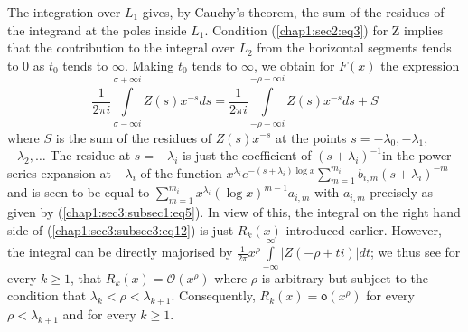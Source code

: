 The integration over $L_{1}$ gives, by Cauchy's theorem, the sum of
the residues of the integrand at the  poles inside $L_{1}$. Condition
(\ref{chap1:sec2:eq3}) for Z implies that the contribution to the integral over $L_{2}$
from the horizontal segments tends to $0$ as $t_{0}$ tends to
$\infty$. Making $t_{0}$ tends to $\infty$, we obtain for $F(x)$ the
expression 
\begin{equation*}
\frac{1}{2\pi i} \int\limits_{\sigma-\infty i}^{\sigma+\infty
  i}Z(s)x^{-s}ds=\frac{1}{2\pi i}\int\limits_{-\rho-\infty
  i}^{-\rho+\infty i}Z(s)x^{-s}ds+S\tag{12}\label{chap1:sec3:subsec3:eq12}
\end{equation*}
where $S$ is the sum of the residues of $Z(s)x^{-s}$ at the points
$s=-\lambda_{0},-\lambda_{1}$, $-\lambda_{2},\ldots$ The residue at
$s=-\lambda_{i}$ is just the coefficient of $(s+\lambda_{i})^{-1}$in
the power-series expansion at ${-\lambda_{i}}$ of the function
$x^{\lambda_{i}}e^{-(s+\lambda_{i})\log
  x}\sum\limits_{m=1}^{m_{i}} b_{i, m} (s+\lambda_{i})^{-m}$ and is\pageoriginale
seen to be equal to $\sum\limits_{m=1}^{m_{i}}x^{\lambda_{i}}(\log
x)^{m-1}a_{i,m}$ with $a_{i,m}$ precisely as given by
(\ref{chap1:sec3:subsec1:eq5}). In view of
this, the integral on the right hand side of (\ref{chap1:sec3:subsec3:eq12}) is just $R_{k}(x)$
introduced earlier. However, the integral can be directly majorised by
$\frac{1}{2\pi}x^{\rho}\int\limits_{-\infty}^{\infty} |Z(-\rho+
ti)|dt$; we thus see for every $k\ge 1$, that
$R_{k}(x)=\mathcal{O}(x^{\rho})$ where $\rho$ is arbitrary but subject to
the condition that $\lambda_{k}<\rho<\lambda_{k+1}$. Consequently,
$R_{k}(x)=\mathsf{o}(x^{\rho})$ for every $\rho<\lambda_{k+1}$ and for every
$k\ge 1$.

